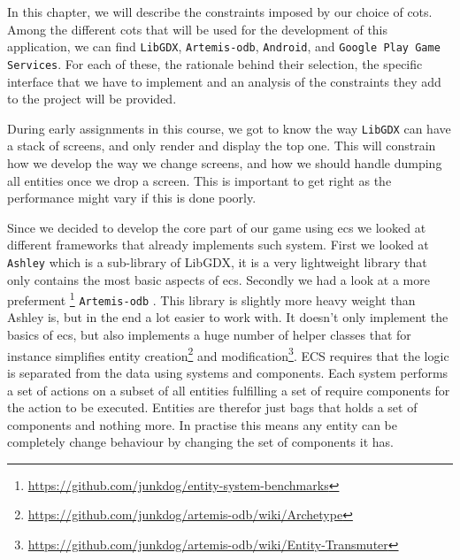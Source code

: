 
In this chapter, we will describe the constraints imposed by our choice of \gls{cots}. Among the different \gls{cots} that will be used for the development of this application, we can find \texttt{LibGDX}, \texttt{Artemis-odb}, \texttt{Android}, and \texttt{Google Play Game Services}. For each of these, the rationale behind their selection, the specific interface that we have to implement and an analysis of the constraints they add to the project will be provided.




During early assignments in this course, we got to know the way \texttt{LibGDX} \citep{libgdx} can have a stack of screens, and only render and display the top one. This will constrain how we develop the way we change screens, and how we should handle dumping all entities once we drop a screen. This is important to get right as the performance might vary if this is done poorly.

Since we decided to develop the core part of our game using \gls{ecs} we looked at different frameworks that already implements such system. First we looked at \texttt{Ashley} \citep{ashley} which is a sub-library of LibGDX, it is a very lightweight library that only contains the most basic aspects of ecs. Secondly we had a look at a more preferment \footnote{\url{https://github.com/junkdog/entity-system-benchmarks}} \texttt{Artemis-odb} \citep{artemis-odb}. This library is slightly more heavy weight than Ashley is, but in the end a lot easier to work with. It doesn't only implement the basics of ecs, but also implements a huge number of helper classes that for instance simplifies entity creation\footnote{\url{https://github.com/junkdog/artemis-odb/wiki/Archetype}} and modification\footnote{\url{https://github.com/junkdog/artemis-odb/wiki/Entity-Transmuter}}. ECS requires that the logic is separated from the data using systems and components. Each system performs a set of actions on a subset of all entities fulfilling a set of require components for the action to be executed. Entities are therefor just bags that holds a set of components and nothing more. In practise this means any entity can be completely change behaviour by changing the set of components it has.

